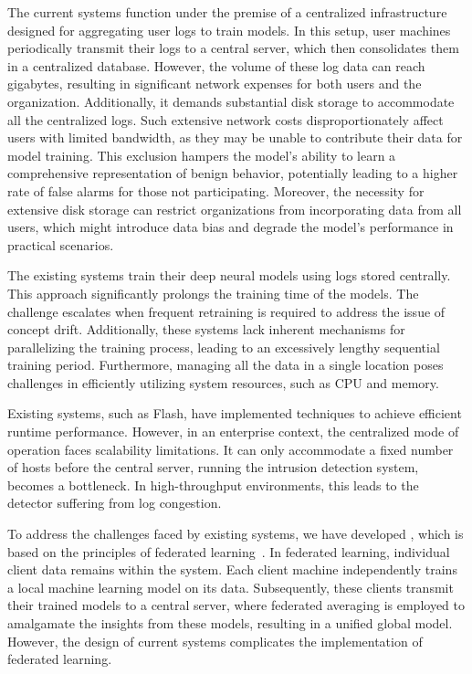  The current systems function under the premise of a centralized infrastructure designed for aggregating user logs to train models. In this setup, user machines periodically transmit their logs to a central server, which then consolidates them in a centralized database. However, the volume of these log data can reach gigabytes, resulting in significant network expenses for both users and the organization. Additionally, it demands substantial disk storage to accommodate all the centralized logs. Such extensive network costs disproportionately affect users with limited bandwidth, as they may be unable to contribute their data for model training. This exclusion hampers the model's ability to learn a comprehensive representation of benign behavior, potentially leading to a higher rate of false alarms for those not participating. Moreover, the necessity for extensive disk storage can restrict organizations from incorporating data from all users, which might introduce data bias and degrade the model's performance in practical scenarios.

 The existing systems train their deep neural models using logs stored centrally. This approach significantly prolongs the training time of the models. The challenge escalates when frequent retraining is required to address the issue of concept drift. Additionally, these systems lack inherent mechanisms for parallelizing the training process, leading to an excessively lengthy sequential training period. Furthermore, managing all the data in a single location poses challenges in efficiently utilizing system resources, such as CPU and memory.

 Existing systems, such as Flash, have implemented techniques to achieve efficient runtime performance. However, in an enterprise context, the centralized mode of operation faces scalability limitations. It can only accommodate a fixed number of hosts before the central server, running the intrusion detection system, becomes a bottleneck. In high-throughput environments, this leads to the detector suffering from log congestion.

To address the challenges faced by existing systems, we have developed \Sys, which is based on the principles of federated learning~\cite{mcmahan2017communication}. In federated learning, individual client data remains within the system. Each client machine independently trains a local machine learning model on its data. Subsequently, these clients transmit their trained models to a central server, where federated averaging is employed to amalgamate the insights from these models, resulting in a unified global model. However, the design of current systems complicates the implementation of federated learning. 

